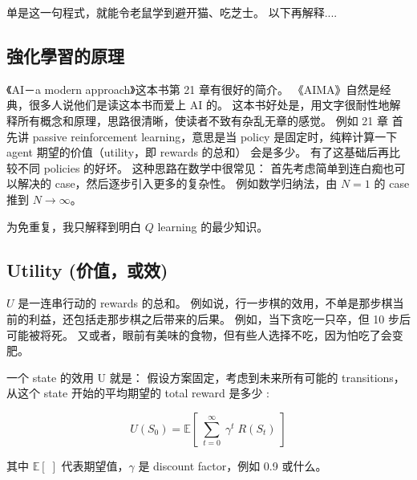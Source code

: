 \tab {}\\
\tab {}\\
\tab {} \\
\tab {}\\
\tab {}\\
\tab \code{\tab \textcolor{red}{self.q[(state, action)] = oldv + self.alpha * (value - oldv) }}

单是这一句程式，就能令老鼠学到避开猫、吃芝士。  以下再解释....


\subsection{強化學習的原理}

《AI－a modern approach》这本书第 21 章有很好的简介。  《AIMA》自然是经典，很多人说他们是读这本书而爱上 AI 的。  这本书好处是，用文字很耐性地解释所有概念和原理，思路很清晰，使读者不致有杂乱无章的感觉。  例如 21 章 首先讲 passive reinforcement learning，意思是当 policy 是固定时，纯粹计算一下 agent 期望的价值（utility，即 rewards 的总和） 会是多少。  有了这基础后再比较不同 policies 的好坏。  这种思路在数学中很常见： 首先考虑简单到连白痴也可以解决的 case，然后逐步引入更多的复杂性。  例如数学归纳法，由 $N=1$ 的 case 推到 $N \rightarrow \infty$。

为免重复，我只解释到明白 $Q$ learning 的最少知识。

\subsection{Utility (价值，或效)}

$U$ 是一连串行动的 rewards 的总和。  例如说，行一步棋的效用，不单是那步棋当前的利益，还包括走那步棋之后带来的后果。  例如，当下贪吃一只卒，但 10 步后可能被将死。  又或者，眼前有美味的食物，但有些人选择不吃，因为怕吃了会变肥。

一个 state 的效用 U 就是： 假设方案固定，考虑到未来所有可能的 transitions，从这个 state 开始的平均期望的 total reward 是多少 :

$$ U(S_0) = \mathbb{E}[ \; \sum_{t=0}^{\infty} \; \gamma^t \; R(S_t) \; ] $$

其中 $\mathbb{E[\;]}$ 代表期望值，$\gamma$ 是 discount factor，例如 0.9 或什么。

